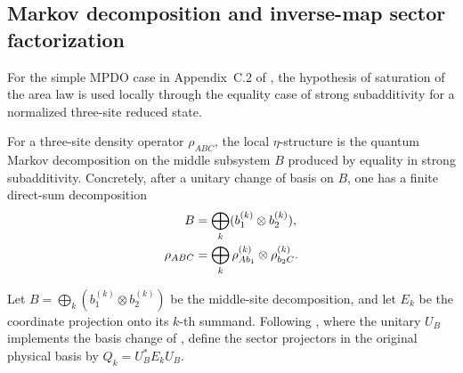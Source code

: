 \subsection{Markov decomposition and inverse-map sector factorization}

For the simple MPDO case in Appendix~C.2 of \cite{Cirac2016MPDO_arXiv},
the hypothesis of saturation of the area law is used locally through the equality case of
strong subadditivity for a normalized three-site reduced state.

\begin{definition}
    \label{def:mpdo_eta_structure}
    \leanok
    For a three-site density operator $\rho_{ABC}$, the local $\eta$-structure
    is the quantum Markov decomposition on the middle subsystem $B$ produced by
    equality in strong subadditivity. Concretely, after a unitary change of
    basis on $B$, one has a finite direct-sum decomposition
    \begin{align}
        B
         & =\bigoplus_k(b_1^{(k)}\otimes b_2^{(k)}),
        \notag                                       \\
        \rho_{ABC}
         & =\bigoplus_k
        \rho_{A b_1}^{(k)}\otimes\rho_{b_2 C}^{(k)}.
        \notag
    \end{align}
\end{definition}

\begin{definition}
    \label{def:mpdo_hayashi_sector_projection}
    \leanok
    Let $B=\bigoplus_k(b_1^{(k)}\otimes b_2^{(k)})$ be the
    middle-site decomposition, and let $E_k$ be the coordinate projection onto
    its $k$-th summand. Following
    \cite[Appendix~C.2, lines~1364--1368]{Cirac2016MPDO_arXiv}, where the
    unitary $U_B$ implements the basis change of
    \cite[Appendix~C.2, lines~1437--1440]{Cirac2016MPDO_arXiv}, define the
    sector projectors in the original physical basis by
    $Q_k=U_B^*E_kU_B$.
\end{definition}

